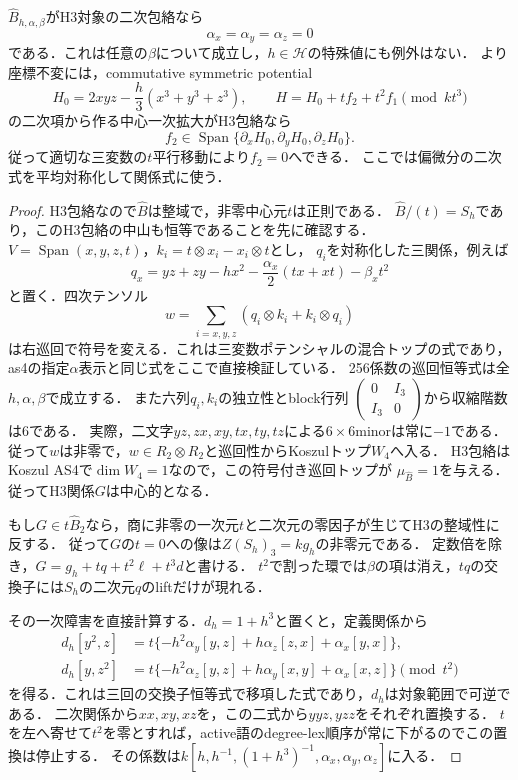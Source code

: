 \begin{theorem}[正規化された二次ポテンシャル係数は全て零]
\label{thm:clifford-quadratic-lift-obstruction}
$\widehat B_{h,\alpha,\beta}$がH3対象の二次包絡なら
\[
 \alpha_x=\alpha_y=\alpha_z=0
\]
である．これは任意の$\beta$について成立し，$h\in\mathcal H$の特殊値にも例外はない．
より座標不変には，commutative symmetric potential
\[
 H_0=2xyz-\frac h3(x^3+y^3+z^3),\qquad
 H=H_0+t f_2+t^2f_1\pmod{kt^3}
\]
の二次項から作る中心一次拡大がH3包絡なら
\[
 f_2\in\operatorname{Span}\{\partial_xH_0,\partial_yH_0,\partial_zH_0\}.
\]
従って適切な三変数の$t$平行移動により$f_2=0$へできる．
ここでは偏微分の二次式を平均対称化して関係式に使う．
\end{theorem}
\begin{proof}
H3包絡なので$\widehat B$は整域で，非零中心元$t$は正則である．
$\widehat B/(t)=S_h$であり，このH3包絡の中山も恒等であることを先に確認する．
$V=\operatorname{Span}(x,y,z,t)$，$k_i=t\otimes x_i-x_i\otimes t$とし，
$q_i$を対称化した三関係，例えば
\[
 q_x=yz+zy-hx^2-\frac{\alpha_x}{2}(tx+xt)-\beta_xt^2
\]
と置く．四次テンソル
\[
 w=\sum_{i=x,y,z}(q_i\otimes k_i+k_i\otimes q_i)
\]
は右巡回で符号を変える．これは三変数ポテンシャルの混合トップの式であり，
as4の指定$\alpha$表示と同じ式をここで直接検証している\cite{AS4pinned}．
256係数の巡回恒等式は全$h,\alpha,\beta$で成立する．
また六列$q_i,k_i$の独立性とblock行列
$\left(\begin{smallmatrix}0&I_3\\I_3&0\end{smallmatrix}\right)$から収縮階数は6である．
実際，二文字$yz,zx,xy,tx,ty,tz$による$6\times6$minorは常に$-1$である．
従って$w$は非零で，$w\in R_2\otimes R_2$と巡回性からKoszulトップ$W_4$へ入る．
H3包絡はKoszul AS4で$\dim W_4=1$なので，この符号付き巡回トップが
$\mu_{\widehat B}=1$を与える．従ってH3関係$G$は中心的となる．

もし$G\in t\widehat B_2$なら，商に非零の一次元$t$と二次元の零因子が生じてH3の整域性に反する．
従って$G$の$t=0$への像は$Z(S_h)_3=kg_h$の非零元である．
定数倍を除き，$G=g_h+tq+t^2\ell+t^3d$と書ける．
$t^2$で割った環では$\beta$の項は消え，$tq$の交換子には$S_h$の二次元$q$のliftだけが現れる．

その一次障害を直接計算する．$d_h=1+h^3$と置くと，定義関係から
\begin{align*}
 d_h[y^2,z]&=t\{-h^2\alpha_y[y,z]+h\alpha_z[z,x]+\alpha_x[y,x]\},\\
 d_h[y,z^2]&=t\{-h^2\alpha_z[y,z]+h\alpha_y[x,y]+\alpha_x[x,z]\}
                         \pmod{t^2}
\end{align*}
を得る．これは三回の交換子恒等式で移項した式であり，$d_h$は対象範囲で可逆である．
二次関係から$xx,xy,xz$を，この二式から$yyz,yzz$をそれぞれ置換する．
$t$を左へ寄せて$t^2$を零とすれば，active語のdegree-lex順序が常に下がるのでこの置換は停止する．
その係数は$k[h,h^{-1},(1+h^3)^{-1},\alpha_x,\alpha_y,\alpha_z]$に入る．


\end{proof}
